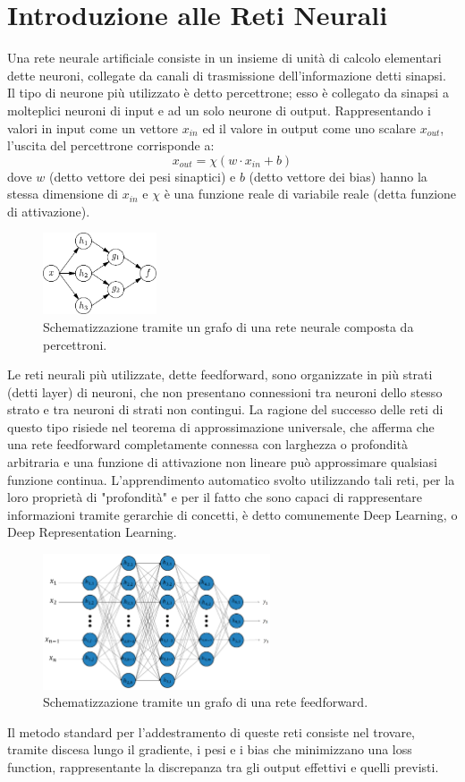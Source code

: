 \documentclass[Lau, noexaminfo, oneside]{sapthesis} %
\begin{document}
\section{Introduzione alle Reti Neurali}
Una rete neurale artificiale consiste in un insieme di unità di calcolo elementari dette neuroni, collegate da canali di trasmissione dell'informazione detti sinapsi.
Il tipo di neurone più utilizzato è detto percettrone; esso è collegato da sinapsi a molteplici neuroni di input e ad un solo neurone di output. Rappresentando i valori in input come un vettore $x_{in}$ ed il valore in output come uno scalare $x_{out}$, l'uscita del percettrone corrisponde a:
\begin{equation}
x_{out} = \chi (w \cdot x_{in} + b)
\end{equation}
dove $w$ (detto vettore dei pesi sinaptici) e $b$ (detto vettore dei bias) hanno la stessa dimensione di $x_{in}$ e $\chi$ è una funzione reale di variabile reale (detta funzione di attivazione).
\begin{figure}[H]
\includegraphics[width=0.3\textwidth]{grafo.pdf}
\centering
\caption{Schematizzazione tramite un grafo di una rete neurale composta da percettroni.}
\end{figure}
Le reti neurali più utilizzate, dette feedforward, sono organizzate in più strati (detti layer) di neuroni, che non presentano connessioni tra neuroni dello stesso strato e tra neuroni di strati non contingui.
La ragione del successo delle reti di questo tipo risiede nel teorema di approssimazione universale, che afferma che una rete feedforward completamente connessa con larghezza o profondità arbitraria e una funzione di attivazione non lineare può approssimare qualsiasi funzione continua. L'apprendimento automatico svolto utilizzando tali reti, per la loro proprietà di "profondità" e per il fatto che sono capaci di rappresentare informazioni tramite gerarchie di concetti, è detto comunemente Deep Learning, o Deep Representation Learning.
\begin{figure}[H]
\includegraphics[width=0.6\textwidth]{information-10-00122-g002.png}
\centering
\caption{Schematizzazione tramite un grafo di una rete feedforward.}
\end{figure}
Il metodo standard per l'addestramento di queste reti consiste nel trovare, tramite discesa lungo il gradiente, i pesi e i bias che minimizzano una loss function, rappresentante la discrepanza tra gli output effettivi e quelli previsti.
\end{document}

